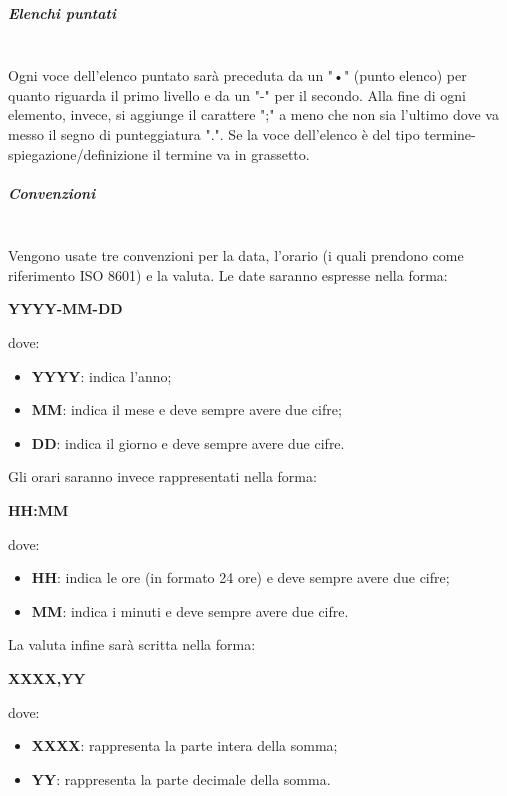                 \subparagraph{Elenchi puntati}\mbox{}\\ [1mm]
                    Ogni voce dell'elenco puntato sarà preceduta da un "•" (punto elenco) per quanto riguarda il primo livello e da un "-" per il secondo.
                    Alla fine di ogni elemento, invece, si aggiunge il carattere ";" a meno che non sia l'ultimo dove va messo il segno di punteggiatura ".".
                    Se la voce dell'elenco è del tipo termine-spiegazione/definizione il termine va in grassetto.
                \subparagraph{Convenzioni}\mbox{}\\ [1mm]
                    Vengono usate tre convenzioni per la data, l'orario (i quali prendono come riferimento ISO 8601) e la valuta. Le date saranno espresse nella forma: \newline \newline
                    \centerline{\textbf{YYYY-MM-DD}} \newline \newline
                    dove:
                    \begin{itemize}
                        \item \textbf{YYYY}: indica l'anno;
                        \item \textbf{MM}: indica il mese e deve sempre avere due cifre;
                        \item \textbf{DD}: indica il giorno e deve sempre avere due cifre.
                    \end{itemize}
                    Gli orari saranno invece rappresentati nella forma: \newline \newline
                    \centerline{\textbf{HH:MM}} \newline \newline
                    dove:
                    \begin{itemize}
                        \item \textbf{HH}: indica le ore (in formato 24 ore) e deve sempre avere due cifre;
                        \item \textbf{MM}: indica i minuti e deve sempre avere due cifre.
                    \end{itemize}
                    La valuta infine sarà scritta nella forma: \newline \newline
                    \centerline{\textbf{XXXX,YY}} \newline \newline
                    dove:
                    \begin{itemize}
                        \item \textbf{XXXX}: rappresenta la parte intera della somma;
                        \item \textbf{YY}: rappresenta la parte decimale della somma.
                    \end{itemize}
